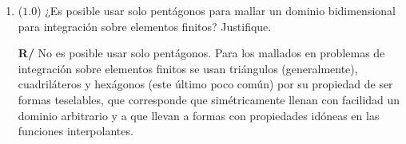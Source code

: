 \documentclass[12pt]{article}
\begin{document}
\begin{enumerate}[leftmargin=*,widest=9]
   \item (\(1.0\)) ¿Es posible usar solo pentágonos para mallar un dominio bidimensional para integración sobre elementos finitos? Justifique.
   
  \textbf{R/} No es posible usar solo pentágonos. Para los mallados en problemas de integración sobre elementos finitos se usan triángulos (generalmente), cuadriláteros y hexágonos (este último poco común) por su propiedad de ser formas teselables, que corresponde que simétricamente llenan con facilidad un dominio arbitrario y a que llevan a formas con propiedades idóneas en las funciones interpolantes.
  \end{enumerate}
\end{document}
